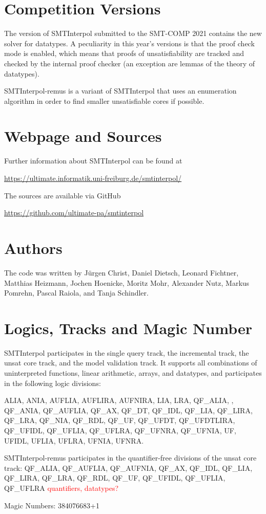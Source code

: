 \documentclass[a4paper]{easychair}
\newcommand\SI{SMTInterpol\xspace}
\newcommand\SIrem{SMTInterpol-remus\xspace}
\newcommand{\TODO}[1]{\textcolor{red}{#1}}
\begin{document}
\section*{Competition Versions}
The version of \SI submitted to the SMT-COMP 2021 contains the new solver for datatypes.
A peculiarity in this year's versions is that the proof check mode is enabled, which means that proofs of unsatisfiability are tracked and checked by the internal proof checker (an exception are lemmas of the theory of datatypes).

\SIrem is a variant of \SI that uses an enumeration algorithm in order to find smaller unsatisfiable cores if possible.

\section*{Webpage and Sources}
Further information about \SI can be found at
\begin{center}
  \url{https://ultimate.informatik.uni-freiburg.de/smtinterpol/}
\end{center}
The sources are available via GitHub
\begin{center}
  \url{https://github.com/ultimate-pa/smtinterpol}
\end{center}

\section*{Authors}
The code was written by J{\"u}rgen Christ, Daniel Dietsch, Leonard Fichtner, Matthias Heizmann, Jochen Hoenicke, Moritz Mohr, Alexander Nutz, Markus Pomrehn, Pascal Raiola, and Tanja Schindler.

\section*{Logics, Tracks and Magic Number}

\SI participates in the single query track, the incremental track, the unsat core track, and the model validation track.
It supports all combinations of uninterpreted functions, linear arithmetic, arrays, and datatypes, and participates in the following logic divisions:

ALIA, ANIA, AUFLIA, AUFLIRA, AUFNIRA, LIA, LRA,
QF\_ALIA, , QF\_ANIA, QF\_AUFLIA, QF\_AX, QF\_DT, QF\_IDL, QF\_LIA, QF\_LIRA, QF\_LRA, QF\_NIA, QF\_RDL, QF\_UF, QF\_UFDT, QF\_UFDTLIRA, QF\_UFIDL, QF\_UFLIA, QF\_UFLRA, QF\_UFNRA, QF\_UFNIA,
UF, UFIDL, UFLIA, UFLRA, UFNIA, UFNRA.

\SIrem participates in the quantifier-free divisions of the unsat core track:
QF\_ALIA, QF\_AUFLIA, QF\_AUFNIA, QF\_AX, QF\_IDL, QF\_LIA, QF\_LIRA, QF\_LRA, QF\_RDL, QF\_UF, QF\_UFIDL, QF\_UFLIA, QF\_UFLRA
\TODO{quantifiers, datatypes?}

Magic Numbers: 384076683+1



\end{document}
